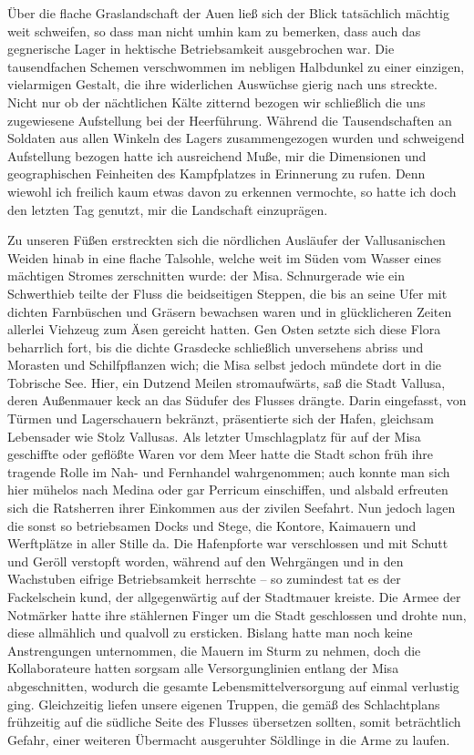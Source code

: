 Über die flache Graslandschaft der Auen ließ sich der Blick tatsächlich mächtig weit schweifen, so dass man nicht umhin kam zu bemerken, dass auch das gegnerische Lager in hektische Betriebsamkeit ausgebrochen war. Die tausendfachen Schemen verschwommen im nebligen Halbdunkel zu einer einzigen, vielarmigen Gestalt, die ihre widerlichen Auswüchse gierig nach uns streckte. Nicht nur ob der nächtlichen Kälte zitternd bezogen wir schließlich die uns zugewiesene Aufstellung bei der Heerführung. Während die Tausendschaften an Soldaten aus allen Winkeln des Lagers zusammengezogen wurden und schweigend Aufstellung bezogen hatte ich ausreichend Muße, mir die Dimensionen und geographischen Feinheiten des Kampfplatzes in Erinnerung zu rufen. Denn wiewohl ich freilich kaum etwas davon zu erkennen vermochte, so hatte ich doch den letzten Tag genutzt, mir die Landschaft einzuprägen.

Zu unseren Füßen erstreckten sich die nördlichen Ausläufer der Vallusanischen Weiden hinab in eine flache Talsohle, welche weit im Süden vom Wasser eines mächtigen Stromes zerschnitten wurde: der Misa. Schnurgerade wie ein Schwerthieb teilte der Fluss die beidseitigen Steppen, die bis an seine Ufer mit dichten Farnbüschen und Gräsern bewachsen waren und in glücklicheren Zeiten allerlei Viehzeug zum Äsen gereicht hatten. Gen Osten setzte sich diese Flora beharrlich fort, bis die dichte Grasdecke schließlich unversehens abriss und Morasten und Schilfpflanzen wich; die Misa selbst jedoch mündete dort in die Tobrische See. Hier, ein Dutzend Meilen stromaufwärts, saß die Stadt Vallusa, deren Außenmauer keck an das Südufer des Flusses drängte. Darin eingefasst, von Türmen und Lagerschauern bekränzt, präsentierte sich der Hafen, gleichsam Lebensader wie Stolz Vallusas. Als letzter Umschlagplatz für auf der Misa geschiffte oder geflößte Waren vor dem Meer hatte die Stadt schon früh ihre tragende Rolle im Nah- und Fernhandel wahrgenommen; auch konnte man sich hier mühelos nach Medina oder gar Perricum einschiffen, und alsbald erfreuten sich die Ratsherren ihrer Einkommen aus der zivilen Seefahrt. Nun jedoch lagen die sonst so betriebsamen Docks und Stege, die Kontore, Kaimauern und Werftplätze in aller Stille da. Die Hafenpforte war verschlossen und mit Schutt und Geröll verstopft worden, während auf den Wehrgängen und in den Wachstuben eifrige Betriebsamkeit herrschte -- so zumindest tat es der Fackelschein kund, der allgegenwärtig auf der Stadtmauer kreiste. Die Armee der Notmärker hatte ihre stählernen Finger um die Stadt geschlossen und drohte nun, diese allmählich und qualvoll zu ersticken. Bislang hatte man noch keine Anstrengungen unternommen, die Mauern im Sturm zu nehmen, doch die Kollaborateure hatten sorgsam alle Versorgunglinien entlang der Misa abgeschnitten, wodurch die gesamte Lebensmittelversorgung auf einmal verlustig ging. Gleichzeitig liefen unsere eigenen Truppen, die gemäß des Schlachtplans frühzeitig auf die südliche Seite des Flusses übersetzen sollten, somit beträchtlich Gefahr, einer weiteren Übermacht ausgeruhter Söldlinge in die Arme zu laufen.

